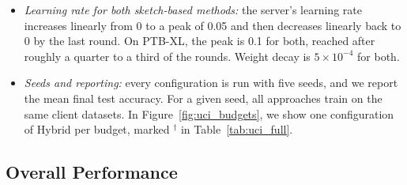 \documentclass[sigconf]{acmart}
\newcommand{\method}{Hybrid}   %
\begin{document}
\begin{itemize}
  instead of 10 at 5\,MB), and 53, 115, 167 and 229 rounds on PTB-XL.
  \item \textit{Learning rate for both sketch-based methods:} the server's
  learning rate increases linearly from 0 to a peak of 0.05 and then decreases
  linearly back to 0 by the last round. %
  On PTB-XL, the peak is 0.1 for both, reached after roughly a quarter to a
  third of the rounds. Weight decay is $5\times10^{-4}$ for both.
  \item \textit{Seeds and reporting:} every configuration is run with five
  seeds, and we report the mean final test accuracy. For a given seed,
  all approaches train on the same client datasets. In
  Figure~\ref{fig:uci_budgets}, we show one configuration of \method{} per
  budget, marked $^\dagger$ in Table~\ref{tab:uci_full}.
\end{itemize}


\subsection{Overall Performance}

\end{document}
